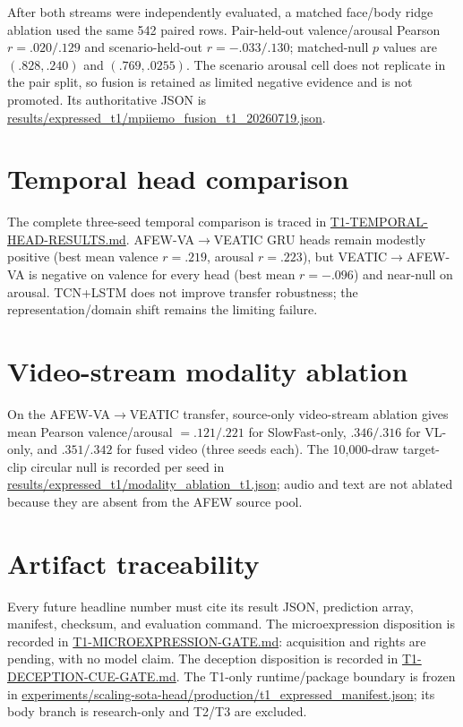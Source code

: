 \documentclass[11pt]{article}
\renewcommand{\texttt}[1]{\url{#1}}
\begin{document}
After both streams were independently evaluated, a matched face/body ridge
ablation used the same 542 paired rows. Pair-held-out valence/arousal Pearson
$r=.020/.129$ and scenario-held-out $r=-.033/.130$; matched-null $p$ values
are $(.828,.240)$ and $(.769,.0255)$. The scenario arousal cell does not
replicate in the pair split, so fusion is retained as limited negative evidence
and is not promoted. Its authoritative JSON is
\texttt{results/expressed_t1/mpiiemo_fusion_t1_20260719.json}.

\section*{Temporal head comparison}
The complete three-seed temporal comparison is traced in
\texttt{T1-TEMPORAL-HEAD-RESULTS.md}. AFEW-VA$\rightarrow$VEATIC GRU heads
remain modestly positive (best mean valence $r=.219$, arousal $r=.223$),
but VEATIC$\rightarrow$AFEW-VA is negative on valence for every head (best
mean $r=-.096$) and near-null on arousal. TCN+LSTM does not improve transfer
robustness; the representation/domain shift remains the limiting failure.

\section*{Video-stream modality ablation}
On the AFEW-VA$\rightarrow$VEATIC transfer, source-only video-stream ablation
gives mean Pearson valence/arousal $=.121/.221$ for SlowFast-only,
$.346/.316$ for VL-only, and $.351/.342$ for fused video (three seeds each).
The 10,000-draw target-clip circular null is recorded per seed in
\texttt{results/expressed_t1/modality_ablation_t1.json}; audio and text are
not ablated because they are absent from the AFEW source pool.

\section*{Artifact traceability}
Every future headline number must cite its result JSON, prediction array,
manifest, checksum, and evaluation command. The microexpression disposition is
recorded in \texttt{T1-MICROEXPRESSION-GATE.md}: acquisition and rights are
pending, with no model claim. The deception disposition is recorded in
\texttt{T1-DECEPTION-CUE-GATE.md}. The T1-only runtime/package boundary is
frozen in \texttt{experiments/scaling-sota-head/production/t1_expressed_manifest.json};
its body branch is research-only and T2/T3 are excluded.
\end{document}
